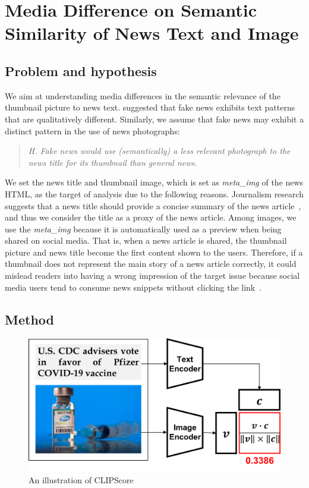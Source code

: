 \documentclass[11pt]{article}
\begin{document}
\section{Media Difference on Semantic Similarity of News Text and Image}

\subsection{Problem and hypothesis}

We aim at understanding media differences in the semantic relevance of the thumbnail picture to news text. \citet{horne2017just} suggested that fake news exhibits text patterns that are qualitatively different. Similarly, we assume that fake news may exhibit a distinct pattern in the use of news photographs:

\begin{quote}
    \emph{H. Fake news would use (semantically) a less relevant photograph to the news title for its thumbnail than general news.}
\end{quote}

We set the news title and thumbnail image, which is set as \textit{meta\_img} of the news HTML, as the target of analysis due to the following reasons. Journalism research suggests that a news title should provide a concise summary of the news article~\cite{smith1982comprehensible}, and thus we consider the title as a proxy of the news article. Among images, we use the \textit{meta\_img} because it is automatically used as a preview when being shared on social media. That is, when a news article is shared, the thumbnail picture and news title become the first content shown to the users.
Therefore, if a thumbnail does not represent the main story of a news article correctly, it could mislead readers into having a wrong impression of the target issue because social media users tend to consume news snippets without clicking the link~\cite{10.1145/2896377.2901462}. 

\subsection{Method}
\graphicspath{ {./fig/} }
\begin{figure}[ht]
    \centering
    \includegraphics[width=\linewidth]{fig/newsinclip6.png}
    \caption{An illustration of CLIPScore}
    \label{fig:clipArch}
\end{figure}
\end{document}
